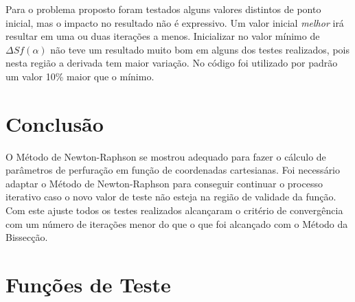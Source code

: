 \documentclass[final,3p,12pt]{elsarticle}
\begin{document}
    Para o problema proposto foram testados alguns valores distintos de ponto inicial, mas o impacto no resultado não é expressivo. Um valor inicial \emph{melhor} irá resultar em uma ou duas iterações a menos. Inicializar no valor mínimo de $\Delta S f(\alpha)$ não teve um resultado muito bom em alguns dos testes realizados, pois nesta região a derivada tem maior variação. No código foi utilizado por padrão um valor 10\% maior que o mínimo. 
        
    \section{Conclusão}
    
    O Método de Newton-Raphson se mostrou adequado para fazer o cálculo de parâmetros de perfuração em função de coordenadas cartesianas. Foi necessário adaptar o Método de Newton-Raphson para conseguir continuar o processo iterativo caso o novo valor de teste não esteja na região de validade da função. Com este ajuste todos os testes realizados alcançaram o critério de convergência com um número de iterações menor do que o que foi alcançado com o Método da Bissecção.

    



 







\newpage

\appendix

\FloatBarrier
\section{Funções de Teste}
\end{document}
